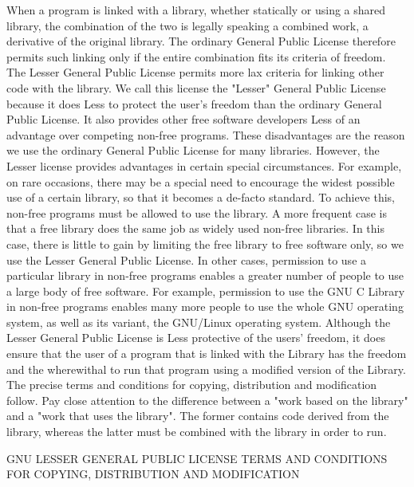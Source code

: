 When a program is linked with a library, whether statically or using a shared library, the combination of the two is legally speaking a combined work, a derivative of the original library. The ordinary General Public License therefore permits such linking only if the entire combination fits its criteria of freedom. The Lesser General Public License permits more lax criteria for linking other code with the library. We call this license the "Lesser" General Public License because it does Less to protect the user's freedom than the ordinary General Public License. It also provides other free software developers Less of an advantage over competing non-free programs. These disadvantages are the reason we use the ordinary General Public License for many libraries. However, the Lesser license provides advantages in certain special circumstances. For example, on rare occasions, there may be a special need to encourage the widest possible use of a certain library, so that it becomes a de-facto standard. To achieve this, non-free programs must be allowed to use the library. A more frequent case is that a free library does the same job as widely used non-free libraries. In this case, there is little to gain by limiting the free library to free software only, so we use the Lesser General Public License. In other cases, permission to use a particular library in non-free programs enables a greater number of people to use a large body of free software. For example, permission to use the GNU C Library in non-free programs enables many more people to use the whole GNU operating system, as well as its variant, the GNU/Linux operating system. Although the Lesser General Public License is Less protective of the users' freedom, it does ensure that the user of a program that is linked with the Library has the freedom and the wherewithal to run that program using a modified version of the Library. The precise terms and conditions for copying, distribution and modification follow. Pay close attention to the difference between a "work based on the library" and a "work that uses the library". The former contains code derived from the library, whereas the latter must be combined with the library in order to run.

GNU LESSER GENERAL PUBLIC LICENSE TERMS AND CONDITIONS FOR COPYING, DISTRIBUTION AND MODIFICATION

